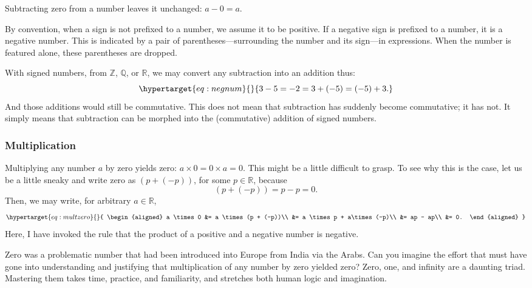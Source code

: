 \documentclass[
  a4paper,
]{article}
\begin{document}
Subtracting zero from a number leaves it unchanged: \(a - 0 = a\).

By convention, when a sign is not prefixed to a number, we assume it to
be positive. If a negative sign is prefixed to a number, it is a
negative number. This is indicated by a pair of
parentheses---surrounding the number and its sign---in expressions. When
the number is featured alone, these parentheses are dropped.

With signed numbers, from \(\mathbb{Z}\), \(\mathbb{Q}\), or
\(\mathbb{R}\), we may convert any subtraction into an addition thus:
\begin{equation}\protect\hypertarget{eq:negnum}{}{
3 - 5 = -2 = 3 + (-5) = (-5) + 3.
}\label{eq:negnum}\end{equation} And those additions would still be
commutative. This does not mean that subtraction has suddenly become
commutative; it has not. It simply means that subtraction can be morphed
into the (commutative) addition of signed numbers.

\hypertarget{multiplication}{%
\subsubsection{Multiplication}\label{multiplication}}

Multiplying any number \(a\) by zero yields zero:
\(a \times 0 = 0 \times a = 0\). This might be a little difficult to
grasp. To see why this is the case, let us be a little sneaky and write
zero as \((p + (-p))\), for some \(p \in \mathbb{R}\), because \[
(p + (-p)) = p - p = 0.
\] Then, we may write, for arbitrary \(a \in \mathbb{R}\),
\begin{equation}\protect\hypertarget{eq:multzero}{}{
\begin{aligned}
a \times 0 &= a \times (p + (-p))\\
&= a \times p + a\times (-p)\\
&= ap - ap\\
&= 0.
\end{aligned}
}\label{eq:multzero}\end{equation} Here, I have invoked the rule that
the product of a positive and a negative number is negative.

Zero was a problematic number that had been introduced into Europe from
India via the Arabs. Can you imagine the effort that must have gone into
understanding and justifying that multiplication of any number by zero
yielded zero? Zero, one, and infinity are a daunting triad. Mastering
them takes time, practice, and familiarity, and stretches both human
logic and imagination.
\end{document}
